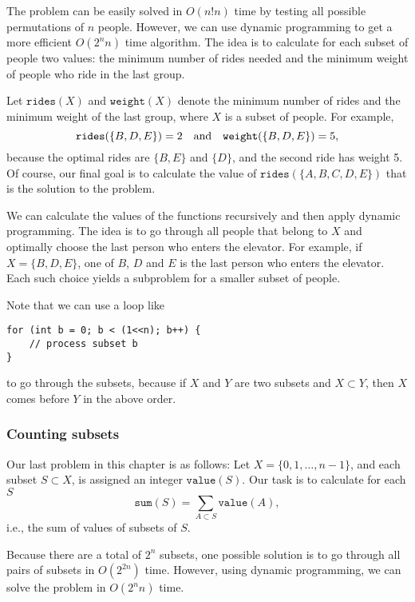 The problem can be easily solved in $O(n! n)$ time
by testing all possible permutations of $n$ people.
However, we can use dynamic programming to get
a more efficient $O(2^n n)$ time algorithm.
The idea is to calculate for each subset of people
two values: the minimum number of rides needed and
the minimum weight of people who ride in the last group.

Let $\texttt{rides}(X)$ and $\texttt{weight}(X)$ denote
the minimum number of rides and the minimum
weight of the last group, where $X$ is a subset
of people. For example,
\[ \texttt{rides}(\{B,D,E\})=2 \hspace{10px} \textrm{and}
\hspace{10px} \texttt{weight}(\{B,D,E\})=5,\]
because the optimal rides are $\{B,E\}$ and $\{D\}$,
and the second ride has weight 5.
Of course, our final goal is to calculate the value
of $\texttt{rides}(\{A,B,C,D,E\})$ that is the solution
to the problem.

We can calculate the values
of the functions recursively and then apply
dynamic programming.
The idea is to go through all people
that belong to $X$ and optimally
choose the last person who enters the elevator.
For example, if $X=\{B,D,E\}$,
one of $B$, $D$ and $E$ is the last person
who enters the elevator.
Each such choice yields a subproblem
for a smaller subset of people.

Note that we can use a loop like
\begin{lstlisting}
for (int b = 0; b < (1<<n); b++) {
    // process subset b
}
\end{lstlisting}
to go through the subsets,
because if $X$ and $Y$ are two subsets
and $X \subset Y$,
then $X$ comes before $Y$ in the above order.

\subsubsection{Counting subsets}

Our last problem in this chapter is as follows:
Let $X=\{0,1,\ldots,n-1\}$, and each subset $S \subset X$,
is assigned an integer $\texttt{value}(S)$.
Our task is to calculate for each $S$
\[\texttt{sum}(S) = \sum_{A \subset S} \texttt{value}(A),\]
i.e., the sum of values of subsets of $S$.

Because there are a total of $2^n$ subsets,
one possible solution is to go through all
pairs of subsets in $O(2^{2n})$ time.
However, using dynamic programming, we
can solve the problem in $O(2^n n)$ time.

